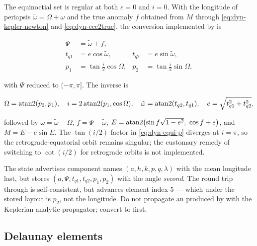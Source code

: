The equinoctial set is regular at both $e=0$ and $i=0$. With the longitude of
periapsis $\tilde\omega=\Omega+\omega$ and the true anomaly $f$ obtained from $M$
through \cref{eq:dyn-kepler-newton} and \cref{eq:dyn-ecc2true}, the conversion
implemented by  is

\begin{align}
  \Psi &= \tilde\omega + f, \label{eq:dyn-equi-psi}\\
  t_{q1} &= e\cos\tilde\omega, & t_{q2} &= e\sin\tilde\omega, \label{eq:dyn-equi-tq}\\
  p_1 &= \tan\frac{i}{2}\cos\Omega, & p_2 &= \tan\frac{i}{2}\sin\Omega, \label{eq:dyn-equi-p}
\end{align}

with $\Psi$ reduced to $(-\pi,\pi]$. The inverse is

\begin{equation}
  \label{eq:dyn-equi-inv}
  \Omega = \operatorname{atan2}(p_2,p_1),
  \quad
  i = 2\operatorname{atan2}(p_1,\cos\Omega),
  \quad
  \tilde\omega = \operatorname{atan2}(t_{q2},t_{q1}),
  \quad
  e = \sqrt{t_{q1}^2+t_{q2}^2},
\end{equation}

followed by $\omega=\tilde\omega-\Omega$, $f=\Psi-\tilde\omega$,
$E=\operatorname{atan2}\!\left(\sin f\sqrt{1-e^2},\ \cos f + e\right)$, and $M=E-e\sin E$.
The $\tan(i/2)$ factor in \cref{eq:dyn-equi-p} diverges at $i=\pi$, so the
retrograde-equatorial orbit remains singular; the customary remedy of switching
to $\cot(i/2)$ for retrograde orbits is not implemented.

\begin{lupntwarning}
  The  state advertises component names
  $(a,h,k,p,q,\lambda)$ with the mean longitude last, but
   stores $(a,\Psi,t_{q1},t_{q2},p_1,p_2)$ with the
  angle \emph{second}. The round trip through  is
  self-consistent, but  advances element
  index $5$ --- which under the stored layout is $p_2$, not the longitude. Do not
  propagate an  produced by  with
  the Keplerian analytic propagator; convert to  first.
\end{lupntwarning}

\subsection{Delaunay elements}
\label{sec:dyn-delaunay}

